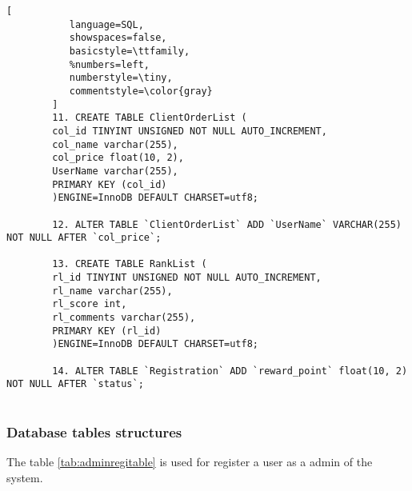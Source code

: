 \documentclass[12pt,a4paper]{article}
\newcommand\tab[1][1cm]{\hspace*{#1}}
\begin{document}
\begin{lstlisting}[
           language=SQL,
           showspaces=false,
           basicstyle=\ttfamily,
           %numbers=left,
           numberstyle=\tiny,
           commentstyle=\color{gray}
        ]
	 	11. CREATE TABLE ClientOrderList (
		col_id TINYINT UNSIGNED NOT NULL AUTO_INCREMENT,
		col_name varchar(255),
		col_price float(10, 2),
		UserName varchar(255),
		PRIMARY KEY (col_id)
		)ENGINE=InnoDB DEFAULT CHARSET=utf8;

	 	12. ALTER TABLE `ClientOrderList` ADD `UserName` VARCHAR(255) NOT NULL AFTER `col_price`;

	 	13. CREATE TABLE RankList (
		rl_id TINYINT UNSIGNED NOT NULL AUTO_INCREMENT,
		rl_name varchar(255),
		rl_score int,
		rl_comments varchar(255),
		PRIMARY KEY (rl_id)
		)ENGINE=InnoDB DEFAULT CHARSET=utf8;
		
	 	14. ALTER TABLE `Registration` ADD `reward_point` float(10, 2) NOT NULL AFTER `status`;
		
	\end{lstlisting}
	\newpage
	\subsubsection{Database tables structures}
		\tab The table \ref{tab:adminregitable} is used for register a user as a admin of the system.
\end{document}
